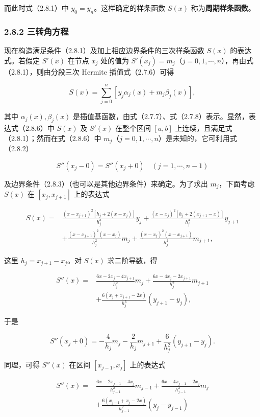 而此时式（2.8.1）中 \(y_0=y_n\)。这样确定的样条函数 \(S(x)\) 称为\textbf{周期样条函数}。

\subsubsection{2.8.2 三转角方程}\label{ch02b-ux4e09ux8f6cux89d2ux65b9ux7a0b}

现在构造满足条件（2.8.1）及加上相应边界条件的三次样条函数 \(S(x)\) 的表达式。若假定 \(S'(x)\) 在节点 \(x_j\) 处的值为 \(S'(x_j)=m_j\)（\(j=0,1,\cdots,n\)），再由式（2.8.1），则由分段三次 Hermite 插值式（2.7.6）可得

\[S(x)=\sum_{j=0}^n[y_j\alpha_j(x)+m_j\beta_j(x)],\tag{2.8.6}\]

其中 \(\alpha_j(x),\beta_j(x)\) 是插值基函数，由式（2.7.7）、式（2.7.8）表示。显然，表达式（2.8.6）中 \(S(x)\) 及 \(S'(x)\) 在整个区间 \([a,b]\) 上连续，且满足式（2.8.1）；然而在式（2.8.6）中 \(m_j\)（\(j=0,1,\cdots,n\)）是未知的，它可利用式（2.8.2）

\[S''(x_j-0)=S''(x_j+0)\quad(j=1,\cdots,n-1)\]

及边界条件（2.8.3）（也可以是其他边界条件）来确定。为了求出 \(m_j\)，下面考虑 \(S(x)\) 在 \([x_j,x_{j+1}]\) 上的表达式

\[\begin{aligned}
S(x)={}&\frac{(x-x_{j+1})^2[h_j+2(x-x_j)]}{h_j^3}y_j+\frac{(x-x_j)^2[h_j+2(x_{j+1}-x)]}{h_j^3}y_{j+1}\\
&+\frac{(x-x_{j+1})^2(x-x_j)}{h_j^2}m_j+\frac{(x-x_j)^2(x-x_{j+1})}{h_j^2}m_{j+1},
\end{aligned}\tag{2.8.7}\]

这里 \(h_j=x_{j+1}-x_j\)。对 \(S(x)\) 求二阶导数，得

\[\begin{aligned}
S''(x)={}&\frac{6x-2x_j-4x_{j+1}}{h_j^2}m_j+\frac{6x-4x_j-2x_{j+1}}{h_j^2}m_{j+1}\\
&+\frac{6(x_j+x_{j+1}-2x)}{h_j^3}(y_{j+1}-y_j),
\end{aligned}\]

于是

\[S''(x_j+0)=-\frac4{h_j}m_j-\frac2{h_j}m_{j+1}+\frac6{h_j^2}(y_{j+1}-y_j).\]

同理，可得 \(S''(x)\) 在区间 \([x_{j-1},x_j]\) 上的表达式

\[\begin{aligned}
S''(x)={}&\frac{6x-2x_{j-1}-4x_j}{h_{j-1}^2}m_{j-1}+\frac{6x-4x_{j-1}-2x_j}{h_{j-1}^2}m_j\\
&+\frac{6(x_{j-1}+x_j-2x)}{h_{j-1}^2}(y_j-y_{j-1})
\end{aligned}\]


